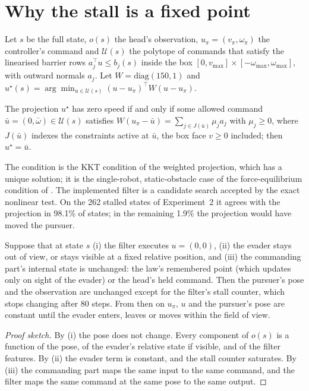 \documentclass{l4dc2027}
\newcommand{\vmax}{v_{\max}}
\newcommand{\wmax}{\omega_{\max}}
\newcommand{\adm}{\mathcal{U}}
\begin{document}
\section{Why the stall is a fixed point}\label{sec:formal}

Let $s$ be the full state, $o(s)$ the head's observation, $u_\pi = (v_\pi, \omega_\pi)$ the controller's command and $\adm(s)$ the polytope of commands that satisfy the linearised barrier rows $a_j^\top u \le b_j(s)$ inside the box $[0,\vmax]\times[-\wmax,\wmax]$, with outward normals $a_j$. Let $W = \mathrm{diag}(150, 1)$ and $u^\star(s) = \arg\min_{u \in \adm(s)} (u - u_\pi)^\top W (u - u_\pi)$.

\begin{lemma}\label{lem:kkt}
The projection $u^\star$ has zero speed if and only if some allowed command $\bar u = (0, \bar\omega) \in \adm(s)$ satisfies $W(u_\pi - \bar u) = \sum_{j \in J(\bar u)} \mu_j a_j$ with $\mu_j \ge 0$, where $J(\bar u)$ indexes the constraints active at $\bar u$, the box face $v \ge 0$ included; then $u^\star = \bar u$.
\end{lemma}

The condition is the KKT condition of the weighted projection, which has a unique solution; it is the single-robot, static-obstacle case of the force-equilibrium condition of \citet{grover2023before}. The implemented filter is a candidate search accepted by the exact nonlinear test. On the 262 stalled states of Experiment~2 it agrees with the projection in 98.1\% of states; in the remaining 1.9\% the projection would have moved the pursuer.

\begin{proposition}\label{prop:fixed}
Suppose that at state $s$ (i) the filter executes $u = (0, 0)$, (ii) the evader stays out of view, or stays visible at a fixed relative position, and (iii) the commanding part's internal state is unchanged: the law's remembered point (which updates only on sight of the evader) or the head's held command. Then the pursuer's pose and the observation are unchanged except for the filter's stall counter, which stops changing after 80 steps. From then on $u_\pi$, $u$ and the pursuer's pose are constant until the evader enters, leaves or moves within the field of view.
\end{proposition}

\begin{proof}[Proof sketch]
By (i) the pose does not change. Every component of $o(s)$ is a function of the pose, of the evader's relative state if visible, and of the filter features. By (ii) the evader term is constant, and the stall counter saturates. By (iii) the commanding part maps the same input to the same command, and the filter maps the same command at the same pose to the same output.
\end{proof}
\end{document}
